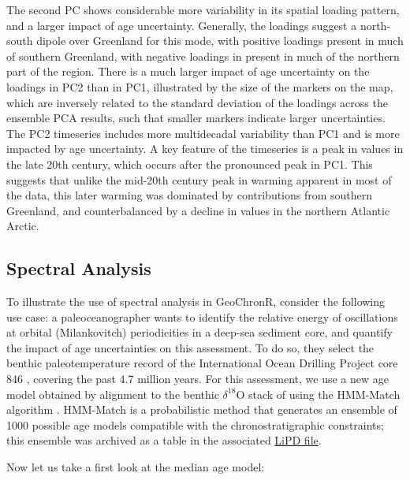 \documentclass[gchron, manuscript]{copernicus}
\begin{document}
The second PC shows considerable more variability in its spatial loading pattern, and a larger impact of age uncertainty.
Generally, the loadings suggest a north-south dipole over Greenland for this mode, with positive loadings present in much of southern Greenland, with negative loadings in present in much of the northern part of the region.
There is a much larger impact of age uncertainty on the loadings in PC2 than in PC1, illustrated by the size of the markers on the map, which are inversely related to the standard deviation of the loadings across the ensemble PCA results, such that smaller markers indicate larger uncertainties.
The PC2 timeseries includes more multidecadal variability than PC1 and is more impacted by age uncertainty.
A key feature of the timeseries is a peak in values in the late 20th century, which occurs after the pronounced peak in PC1.
This suggests that unlike the mid-20th century peak in warming apparent in most of the data, this later warming was dominated by contributions from southern Greenland, and counterbalanced by a decline in values in the northern Atlantic Arctic.

\hypertarget{sec:spec_vignette}{%
\subsection{Spectral Analysis}\label{sec:spec_vignette}}

To illustrate the use of spectral analysis in GeoChronR, consider the following use case: a paleoceanographer wants to identify the relative energy of oscillations at orbital (Milankovitch) periodicities in a deep-sea sediment core, and quantify the impact of age uncertainties on this assessment.
To do so, they select the benthic paleotemperature record of the International Ocean Drilling Project core 846 \citep[\citet{Shackleton95}]{mix1995benthic}, covering the past 4.7 million years.
For this assessment, we use a new age model obtained by alignment to the benthic \(\delta^{18}\mathrm{O}\) stack of \citet{LisieckiRaymo05} using the HMM-Match algorithm \citep[\citet{Khider_2017}]{ProbStack}.
HMM-Match is a probabilistic method that generates an ensemble of 1000 possible age models compatible with the chronostratigraphic constraints; this ensemble was archived as a table in the associated \href{http://lipdverse.org/geoChronR-examples/ODP846.Lawrence.2006.lpd}{LiPD file}.

Now let us take a first look at the median age model:
\end{document}
